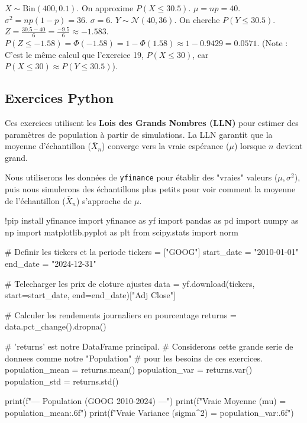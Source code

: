 \begin{correctionbox}
$X \sim \text{Bin}(400, 0.1)$. On approxime $P(X \le 30.5)$.
$\mu = np = 40$. $\sigma^2 = np(1-p) = 36$. $\sigma = 6$.
$Y \sim \mathcal{N}(40, 36)$.
On cherche $P(Y \le 30.5)$.
$Z = \frac{30.5 - 40}{6} = \frac{-9.5}{6} \approx -1.583$.
$P(Z \le -1.58) = \Phi(-1.58) = 1 - \Phi(1.58) \approx 1 - 0.9429 = 0.0571$.
(Note : C'est le même calcul que l'exercice 19, $P(X \le 30)$, car $P(X \le 30) \approx P(Y \le 30.5)$).
\end{correctionbox}

\subsection{Exercices Python}

Ces exercices utilisent les \textbf{Lois des Grands Nombres (LLN)} pour estimer des paramètres de population à partir de simulations. La LLN garantit que la moyenne d'échantillon ($\bar{X}_n$) converge vers la vraie espérance ($\mu$) lorsque $n$ devient grand.

Nous utiliserons les données de \texttt{yfinance} pour établir des "vraies" valeurs ($\mu, \sigma^2$), puis nous simulerons des échantillons plus petits pour voir comment la moyenne de l'échantillon ($\bar{X}_n$) s'approche de $\mu$.

\begin{codecell}
!pip install yfinance
import yfinance as yf
import pandas as pd
import numpy as np
import matplotlib.pyplot as plt
from scipy.stats import norm

# Definir les tickers et la periode
tickers = ["GOOG"]
start_date = "2010-01-01"
end_date = "2024-12-31"

# Telecharger les prix de cloture ajustes
data = yf.download(tickers, start=start_date, end=end_date)["Adj Close"]

# Calculer les rendements journaliers en pourcentage
returns = data.pct_change().dropna()

# 'returns' est notre DataFrame principal.
# Considerons cette grande serie de donnees comme notre "Population"
# pour les besoins de ces exercices.
population_mean = returns.mean()
population_var = returns.var()
population_std = returns.std()

print(f"--- Population (GOOG 2010-2024) ---")
print(f"Vraie Moyenne (mu) = {population_mean:.6f}")
print(f"Vraie Variance (sigma^2) = {population_var:.6f}")
\end{codecell}

